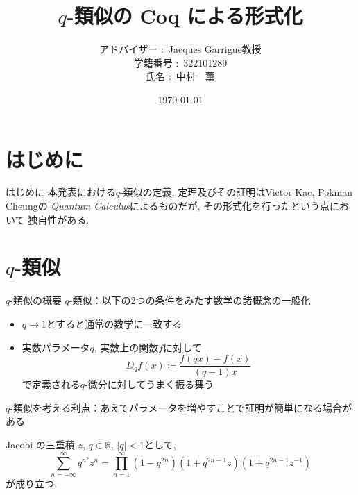 \documentclass[dvipdfmx,cjk]{beamer}
\theoremstyle{mystyle}
\newcommand{\R}{\mathbb{R}}
\newcommand{\0}{\textbf{0}}
\begin{document}
\title{$q$-類似の Coq による形式化}
\author[中村　薫]{アドバイザー $\colon$ Jacques Garrigue教授\\
           学籍番号 $\colon$ 322101289\\
           氏名 $\colon$ 中村　薫}
\date{\today}
\maketitle
\begin{frame}
\tableofcontents
\end{frame}
\section{はじめに}

\begin{frame}
  \tableofcontents[currentsection] 
\end{frame}

\begin{frame}[fragile]{はじめに}
  本発表における$q$-類似の定義, 定理及びその証明はVictor Kac, Pokman Cheungの
  {\it Quantum Calculus}\cite{Kac}によるものだが, その形式化を行ったという点において
  独自性がある. 
\end{frame}
\section{$q$-類似}

\begin{frame}
  \tableofcontents[currentsection] 
\end{frame}

\begin{frame}{$q$-類似の概要}
  $q$-類似：以下の2つの条件をみたす数学の諸概念の一般化
  \begin{itemize}
    \item $q \to 1$とすると通常の数学に一致する
    \item 実数パラメータ$q$, 実数上の関数$f$に対して
      \[
        D_q f(x) \coloneqq \frac{f(qx) - f(x)}{(q - 1) x}
      \]
    で定義される$q$-微分に対してうまく振る舞う
  \end{itemize}
  $q$-類似を考える利点：あえてパラメータを増やすことで証明が簡単になる場合がある
  \begin{itembox}{Jacobi の三重積}
    $z$, $q \in \R$, $|q| < 1$として, 
    \[
      \sum_{n = -\infty}^{\infty} q^{n^2} z^n =
      \prod_{n = 1}^{\infty} (1 - q^{2n})(1 + q^{2n - 1}z)(1 + q^{2n - 1}z^{-1})
    \]
    が成り立つ. 
  \end{itembox}
\end{frame}
\end{document}
